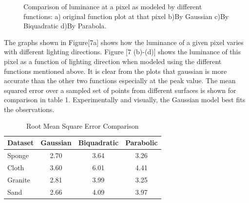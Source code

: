 \begin{figure}[t]
{\label{fig:subfig3}
}
\caption{Comparison of luminance
 at a pixel as modeled by different functions: a) original
function plot at that pixel b)By Gaussian c)By Biquadratic
d)By Parabola.}  \label{fig:subfigureExample}
\end{figure}


The graphs shown in Figure[7a] shows how the luminance of a given pixel varies
with different lighting directions. Figure [7 (b)-(d)] shows the luminance of
this pixel as a function of lighting direction when modeled using the different
functions mentioned above. It is clear from the plots that gaussian is more
accurate than the other two functions especially at the peak value. The mean
squared error over a sampled set of points from different surfaces is shown for
comparison in table 1. Experimentally and visually, the Gaussian model best fits
the observations.

\begin{table}[ht]
\centering
 \caption{Root Mean Square Error Comparison}
  \begin{tabular}{| l | c | c | c |}
    \hline
    Dataset & Gaussian & Biquadratic & Parabolic\\ \hline
    Sponge & 2.70 & 3.64 & 3.26\\ \hline
    Cloth &  3.60 & 6.01 & 4.41\\ \hline
    Granite & 2.81 & 3.99 & 3.25\\ \hline
    Sand & 2.66 & 4.09 & 3.97\\ \hline
  \end{tabular}
\end{table}


